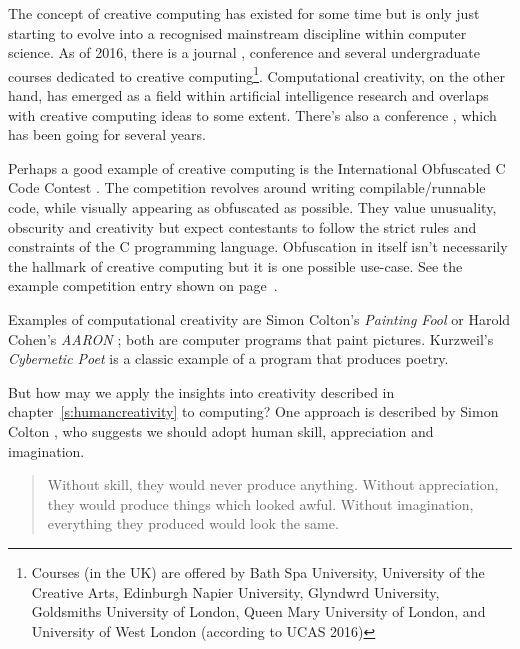 The concept of creative computing has existed for some time but is only just starting to evolve into a recognised mainstream discipline within computer science. As of 2016, there is a journal \autocite{IJoCCnd}, conference \autocite{ISCC2016} and several undergraduate courses dedicated to creative computing\footnote{Courses (in the UK) are offered by Bath Spa University, University of the Creative Arts, Edinburgh Napier University, Glyndwrd University, Goldsmiths University of London, Queen Mary University of London, and University of West London (according to UCAS 2016)}. Computational creativity, on the other hand, has emerged as a field within artificial intelligence research and overlaps with creative computing ideas to some extent. There's also a conference \autocite{ICCC2017}, which has been going for several years.

Perhaps a good example of creative computing is the International Obfuscated C Code Contest \autocite{Broukhis}. The competition revolves around writing compilable/runnable code, while visually appearing as obfuscated as possible. They value unusuality, obscurity and creativity but expect contestants to follow the strict rules and constraints of the C programming language. Obfuscation in itself isn't necessarily the hallmark of creative computing but it is one possible use-case. See the example competition entry shown on page~\pageref{code:goren}.

Examples of computational creativity are Simon Colton's \textit{Painting Fool} \autocite*{Coltonnd} or Harold Cohen's \textit{AARON} \autocite{kurzweilcyberartnd}; both are computer programs that paint pictures. Kurzweil's \textit{Cybernetic Poet} \autocite{kurzweilcyberart2001} is a classic example of a program that produces poetry.

\spirals

But how may we apply the insights into creativity described in chapter~\ref{s:humancreativity} to computing? One approach is described by Simon Colton \autocite*{Colton2008}, who suggests we should adopt human skill, appreciation and imagination.

\begin{quotation}
  Without skill, they would never produce anything. Without appreciation, they would produce things which looked awful. Without imagination, everything they produced would look the same. 
\end{quotation}

